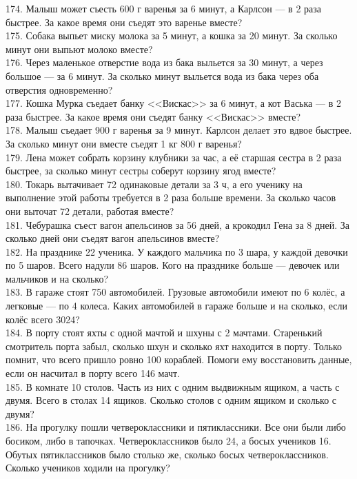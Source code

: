 174. Малыш может съесть 600 г варенья за 6 минут, а Карлсон --- в 2 раза быстрее. За какое время они съедят это варенье вместе?\\
175. Собака выпьет миску молока за 5 минут, а кошка за 20 минут. За сколько минут они выпьют молоко вместе?\\
176. Через маленькое отверстие вода из бака выльется за 30 минут, а через большое --- за 6 минут. За сколько минут выльется вода из бака через оба отверстия одновременно?\\
177. Кошка Мурка съедает банку <<Вискас>> за 6 минут, а кот Васька --- в 2 раза быстрее. За какое время они съедят банку <<Вискас>> вместе?\\
178. Малыш съедает 900 г варенья за 9 минут. Карлсон делает это вдвое быстрее. За сколько минут они вместе съедят  1 кг 800 г варенья?\\
179. Лена  может собрать корзину клубники за час, а её старшая сестра в 2 раза быстрее, за сколько минут сестры соберут корзину ягод вместе?\\
180. Токарь вытачивает 72 одинаковые детали за 3 ч, а его ученику на выполнение этой работы требуется в 2 раза больше времени. За сколько часов они выточат 72 детали, работая вместе?\\
181. Чебурашка съест вагон апельсинов за 56 дней, а крокодил Гена за 8 дней. За сколько дней они съедят вагон апельсинов вместе?\\
182. На празднике 22 ученика. У каждого мальчика по 3 шара, у каждой девочки по 5 шаров. Всего надули 86 шаров. Кого на празднике больше --- девочек или мальчиков и на сколько?\\
183. В гараже стоят 750 автомобилей. Грузовые автомобили имеют по 6 колёс, а легковые --- по 4 колеса. Каких автомобилей в гараже больше и на сколько, если колёс всего 3024?\\
184. В порту стоят яхты с одной мачтой и шхуны с 2 мачтами. Старенький смотритель порта забыл, сколько шхун и сколько яхт находится в порту. Только помнит, что всего пришло ровно 100 кораблей. Помоги ему восстановить данные, если он насчитал в порту всего 146 мачт.\\
185. В комнате 10 столов. Часть из них с одним выдвижным ящиком, а часть с двумя. Всего в столах 14 ящиков. Сколько столов с одним ящиком и сколько с двумя?\\
186. На прогулку пошли четвероклассники и пятиклассники. Все они были либо босиком, либо в тапочках. Четвероклассников было 24, а босых учеников 16. Обутых пятиклассников было столько же, сколько босых четвероклассников. Сколько учеников  ходили на прогулку?\\
